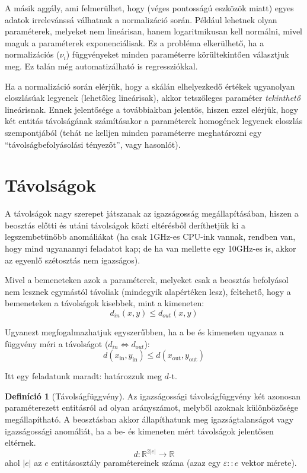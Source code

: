 \documentclass{article}
\theoremstyle{definition}
\newtheorem{definition}{Definíció}[section]
\newcommand{\subin}[1]{ {#1}_{\text{in}} }
\newcommand{\subout}[1]{ {#1}_{\text{out}} }
\begin{document}
\begin{multicols}{2}
    A másik aggály, ami felmerülhet, hogy (véges pontosságú eszközök miatt) egyes adatok irrelevánssá válhatnak a normalizáció során. Például lehetnek olyan paraméterek, melyeket nem lineárisan, hanem logaritmikusan kell normálni, mivel maguk a paraméterek exponenciálisak. Ez a probléma elkerülhető, ha a normalizációs ($\nu_i$) függvényeket minden paraméterre körültekintően választjuk meg. Ez talán még automatizálható is regressziókkal.
    
    Ha a normalizáció során elérjük, hogy a skálán elhelyezkedő értékek ugyanolyan eloszlásúak legyenek (lehetőleg lineárisak), akkor tetszőleges paraméter {\it tekinthető} lineárisnak. Ennek jelentősége a továbbiakban jelentős, hiszen ezzel elérjük, hogy két entitás távolságának számításakor a paraméterek homogének legyenek eloszlás szempontjából (tehát ne kelljen minden paraméterre meghatározni egy \enquote{távolságbefolyásolási tényezőt}, vagy hasonlót).
    
\section{Távolságok}    
    
    A távolságok nagy szerepet játszanak az igazságosság megállapításában, hiszen a beosztás előtti és utáni távolságok közti eltérésből deríthetjük ki a legszembetűnőbb anomáliákat (ha csak 1GHz-es CPU-ink vannak, rendben van, hogy mind ugyanannyi feladatot kap; de ha van mellette egy 10GHz-es is, akkor az egyenlő szétosztás nem igazságos).
    
    Mivel a bemeneteken azok a paraméterek, melyeket csak a beosztás befolyásol nem lesznek egymástól távoliak (mindegyik alapértéken lesz), feltehető, hogy a bemeneteken a távolságok kisebbek, mint a kimeneten:
    $$ d_{in}(x, y) \leq d_{out}(x, y) $$
    
    Ugyanezt megfogalmazhatjuk egyszerűbben, ha a be és kimeneten ugyanaz a függvény méri a távolságot ($d_{in} \Leftrightarrow d_{out}$):
    \begin{equation}
        d(\subin{x}, \subin{y}) \leq d(\subout{x}, \subout{y})
    \end{equation}
    
    Itt egy feladatunk maradt: határozzuk meg $d$-t.
    
    \begin{definition}[Távolságfüggvény]
        Az igazságossági távolságfüggvény két azonosan paraméterezett entitásról ad olyan arányszámot, melyből azoknak különbözősége megállapítható. A beosztásban akkor állapíthatunk meg igazságtalanságot vagy igazságossági anomáliát, ha a be- és kimeneten mért távolságok jelentősen eltérnek.
        \begin{equation}
            d: \mathbb{R}^{2|e|} \to \mathbb{R}
        \end{equation}
        ahol $|e|$ az $e$ entitásosztály paramétereinek száma (azaz egy $\varepsilon :: e$ vektor mérete).
    \end{definition}
    

\end{multicols}
\end{document}
